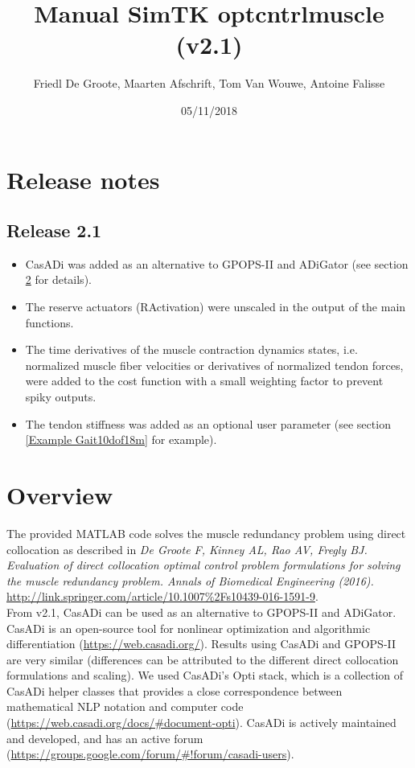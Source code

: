 \documentclass[a4paper,oneside,11pt]{article}
\begin{document}
\title{Manual SimTK optcntrlmuscle (v2.1)}
\author{Friedl De Groote, Maarten Afschrift, Tom Van Wouwe, Antoine Falisse}
\date{05/11/2018} 
\maketitle
\tableofcontents

\section{Release notes}

\subsection{Release 2.1}
\begin{itemize}
	\item CasADi was added as an alternative to GPOPS-II and ADiGator (see section \ref{Overview} for details).
	\item The reserve actuators (RActivation) were unscaled in the output of the main functions.
	\item The time derivatives of the muscle contraction dynamics states, i.e. normalized muscle fiber velocities or derivatives of normalized tendon forces, were added to the cost function with a small weighting factor to prevent spiky outputs.
	 \item The tendon stiffness was added as an optional user parameter (see section \ref{Example Gait10dof18m} for example).
\end{itemize}


\section{Overview}
\label{Overview}

The provided MATLAB code solves the muscle redundancy problem using direct collocation as described in \textit{De Groote F, Kinney AL, Rao AV, Fregly BJ. Evaluation of direct collocation optimal control problem formulations for solving the muscle redundancy problem. Annals of Biomedical Engineering (2016).} \url{http://link.springer.com/article/10.1007%2Fs10439-016-1591-9}. 
\\

From v2.1, CasADi can be used as an alternative to GPOPS-II and ADiGator. CasADi is an open-source tool for nonlinear optimization and algorithmic differentiation (\url{https://web.casadi.org/}). Results using CasADi and GPOPS-II are very similar (differences can be attributed to the different direct collocation formulations and scaling). We used CasADi's Opti stack, which is a collection of CasADi helper classes that provides a close correspondence between mathematical NLP notation and computer code (\url{https://web.casadi.org/docs/#document-opti}). CasADi is actively maintained and developed, and has an active forum (\url{https://groups.google.com/forum/#!forum/casadi-users}). \\
\end{document}
